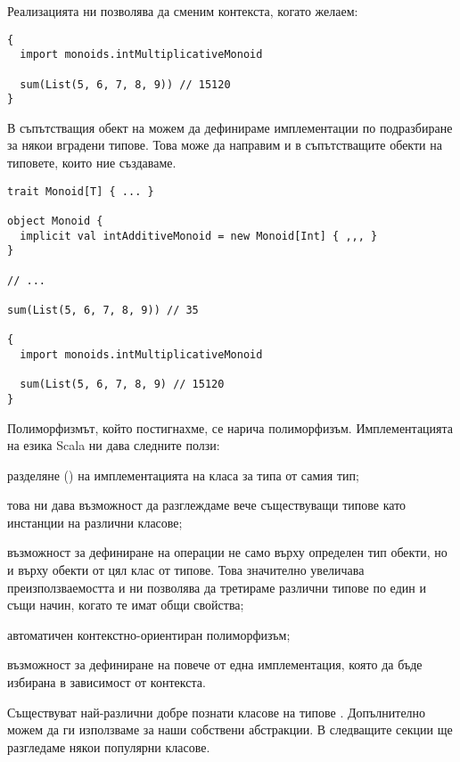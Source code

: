 Реализацията ни позволява да сменим контекста, когато желаем:

\begin{lstlisting}
{
  import monoids.intMultiplicativeMonoid
  
  sum(List(5, 6, 7, 8, 9)) // 15120
}
\end{lstlisting}

В съпътстващия обект на  можем да дефинираме имплементации по подразбиране за някои вградени типове. Това може да направим и в съпътстващите обекти на типовете, които ние създаваме.

\begin{lstlisting}
trait Monoid[T] { ... }

object Monoid {
  implicit val intAdditiveMonoid = new Monoid[Int] { ,,, }
}

// ...

sum(List(5, 6, 7, 8, 9)) // 35

{
  import monoids.intMultiplicativeMonoid
  
  sum(List(5, 6, 7, 8, 9) // 15120
}
\end{lstlisting}

Полиморфизмът, който постигнахме, се нарича  полиморфизъм. Имплементацията на езика Scala ни дава следните ползи:

\begin{itemize*}
  \item разделяне () на имплементацията на класа за типа от самия тип;
  \item това ни дава възможност да разглеждаме вече съществуващи типове като инстанции на различни класове;
  \item възможност за дефиниране на операции не само върху определен тип обекти, но и върху обекти от цял клас от типове. Това значително увеличава преизползваемостта и ни позволява да третираме различни типове по един и същи начин, когато те имат общи свойства;
  \item автоматичен контекстно-ориентиран полиморфизъм;
  \item възможност за дефиниране на повече от една имплементация, която да бъде избирана в зависимост от контекста.
\end{itemize*}

Съществуват най-различни добре познати класове на типове \cite{yorget2009Typeclasses}. Допълнително можем да ги използваме за наши собствени абстракции. В следващите секции ще разгледаме някои популярни класове.

